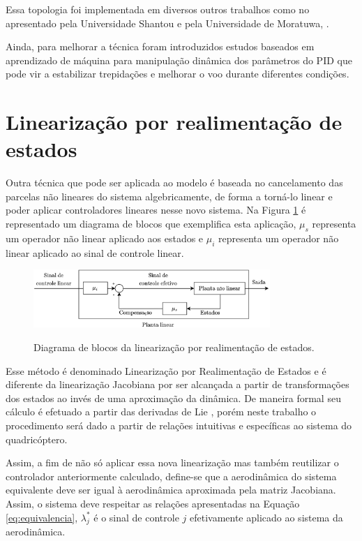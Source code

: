 \documentclass[main.tex]{subfiles}
\begin{document}
	Essa topologia foi implementada em diversos outros trabalhos como no apresentado pela Universidade Shantou \cite{controle:pid} e pela Universidade de Moratuwa, \cite{controle:pid_modelagem_basica}. 
	
	Ainda, para melhorar a técnica foram introduzidos estudos baseados em aprendizado de máquina \cite{controle:pid-aprendizado-maquina} para manipulação dinâmica dos parâmetros do PID que pode vir a estabilizar trepidações e melhorar o voo durante diferentes condições.
	
	\section{Linearização por realimentação de estados}
	
	Outra técnica que pode ser aplicada ao modelo é baseada no cancelamento das parcelas não lineares do sistema algebricamente, de forma a torná-lo linear e poder aplicar controladores lineares nesse novo sistema. Na Figura \ref{fig:exemplo_rnl} é representado um diagrama de blocos que exemplifica esta aplicação, $\mu_s$ representa um operador não linear aplicado aos estados e $\mu_i$ representa um operador não linear aplicado ao sinal de controle linear.
	
	\begin{figure}[!h]
		\centering
		\caption{Diagrama de blocos da linearização por realimentação de estados.}
		\includegraphics[width=0.8\textwidth]{capitulos/controle_atitude/imgs/exemplo_rnl.png}
		\label{fig:exemplo_rnl}
	\end{figure}
	
	
	Esse método é denominado Linearização por Realimentação de Estados \cite{slotine} e é diferente da linearização Jacobiana por ser alcançada a partir de transformações dos estados ao invés de uma aproximação da dinâmica. De maneira formal seu cálculo é efetuado a partir das derivadas de Lie \cite{lie_derivative}, porém neste trabalho o procedimento será dado a partir de relações intuitivas e específicas ao sistema do quadricóptero.
	
	Assim, a fim de não só aplicar essa nova linearização mas também reutilizar o controlador anteriormente calculado, define-se que a aerodinâmica do sistema equivalente deve ser igual à aerodinâmica aproximada pela matriz Jacobiana. Assim, o sistema deve respeitar as relações apresentadas na Equação \ref{eq:equivalencia}, $\lambda_j^*$ é o sinal de controle $j$ efetivamente aplicado ao sistema da aerodinâmica.
	
\end{document}
